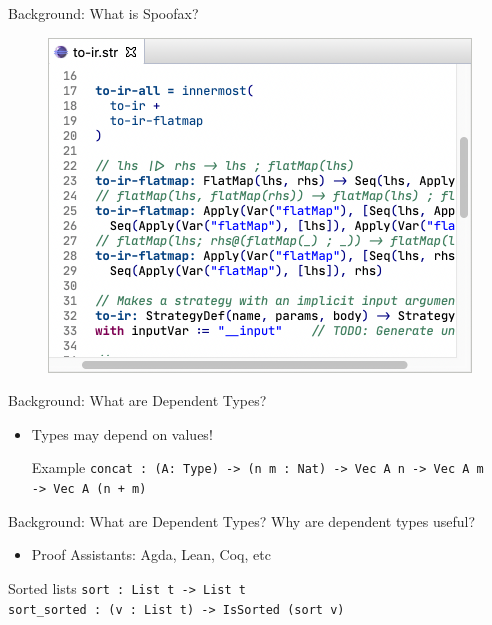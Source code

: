 \documentclass[aspectratio=43]{beamer}
\begin{document}
\begin{frame}[fragile]{Background: What is Spoofax?}
	\begin{figure}
		\includegraphics[width=0.8\linewidth]{img/transformation}
	\end{figure}
\end{frame}

\begin{frame}[fragile]{Background: What are Dependent Types?}
\begin{itemize}
	\item Types may depend on values!
	\begin{exampleblock}{Example}
		\texttt{concat : (A: Type) -> (n m : Nat) -> Vec A n -> Vec A m
			\\ \hspace*{48pt} -> Vec A (n + m)}
	\end{exampleblock}
\end{itemize}
\end{frame}

\begin{frame}[fragile]{Background: What are Dependent Types?}
	Why are dependent types useful?
	\begin{itemize}
		\item Proof Assistants: Agda, Lean, Coq, etc
	\end{itemize}
	
	\begin{exampleblock}{Sorted lists}
\texttt{sort : List t -> List t\\sort\_sorted : (v : List t) -> IsSorted (sort v)}
	\end{exampleblock}
\end{frame}
\end{document}

